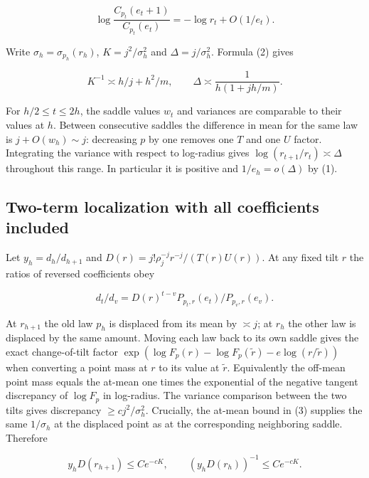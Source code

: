\documentclass[11pt]{article}
\begin{document}
\begin{equation*}
\log \frac{C_{p_t}(e_t+1)}{C_{p_t}(e_t)}
    =-\log r_t+O(1/e_t).
 \tag{4}
\end{equation*}


Write \(\sigma_h=\sigma_{p_h}(r_h)\), \(K=j^2/\sigma_h^2\) and \(\Delta=j/\sigma_h^2\). Formula (2) gives

\begin{equation*}
K^{-1}\asymp h/j+h^2/m,\qquad
 \Delta\asymp \frac1{h(1+jh/m)}.
\end{equation*}

For \(h/2\le t\le 2h\), the saddle values \(w_t\) and variances are comparable to their values at \(h\). Between consecutive saddles the difference in mean for the same law is \(j+O(w_h)\sim j\): decreasing \(p\) by one removes one \(T\) and one \(U\) factor. Integrating the variance with respect to log-radius gives \(\log(r_{t+1}/r_t)\asymp\Delta\) throughout this range. In particular it is positive and \(1/e_h=o(\Delta)\) by (1).

\subsection{Two-term localization with all coefficients included}
\label{sec:two-term-localization-with-all-coefficients-included}

Let \(y_h=d_h/d_{h+1}\) and \(D(r)=j!\rho_j^{-j}r^{-j}/(T(r)U(r))\). At any fixed tilt \(r\) the ratios of reversed coefficients obey

\begin{equation*}
d_t/d_v=D(r)^{t-v}P_{p_t,r}(e_t)/P_{p_v,r}(e_v).
 \tag{5}
\end{equation*}

At \(r_{h+1}\) the old law \(p_h\) is displaced from its mean by \(\asymp j\); at \(r_h\) the other law is displaced by the same amount. Moving each law back to its own saddle gives the exact change-of-tilt factor
\(\exp(\log F_p(r)-\log F_p(\tilde r)-e\log(r/\tilde r))\) when converting a point mass at \(r\) to its value at \(\tilde r\). Equivalently the off-mean point mass equals the at-mean one times the exponential of the negative tangent discrepancy of \(\log F_p\) in log-radius. The variance comparison between the two tilts gives discrepancy \(\ge c j^2/\sigma_h^2\). Crucially, the at-mean bound in (3) supplies the same \(1/\sigma_h\) at the displaced point as at the corresponding neighboring saddle. Therefore

\begin{equation*}
y_h D(r_{h+1})\le C e^{-cK},\qquad (y_h D(r_h))^{-1}\le C e^{-cK}.
\end{equation*}
\end{document}
